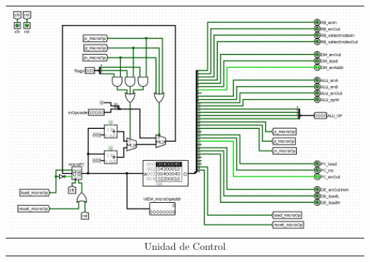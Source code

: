\documentclass[a4paper,11pt]{article}
\begin{document}
\vspace{0.5cm}

\begin{center}
\begin{tabular}[t]{c}
\includegraphics[scale=0.3]{img/7_ControlUnit.png}\\
\hline
Unidad de Control\\ \hline
\end{tabular}
\end{center}
\end{document}
